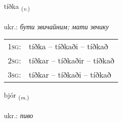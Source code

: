 \documentclass[frontgrid, backgrid]{flacards}\usepackage[]{graphicx}\usepackage[]{xcolor}
\begin{document}
\renewcommand{\flhead}{\vskip5pt \fboxsep=0pt {\small\bfseries\footnotesize Nagnorð | дієслово}}
\renewcommand{\fcfoot}{\vskip5pt \fboxsep=0pt \hspace{2pt}{\small\bfseries\footnotesize 2K}}

\renewcommand{\blhead}{\vskip5pt {\small\bfseries\footnotesize Nagnorð | дієслово }}
\renewcommand{\bcfoot}{\vskip5pt \hspace{2pt}{\small\bfseries\footnotesize 2K}}


{tíðka \small{\textsubscript{(\textit{v.})}} \\[1ex] %
\textphonetic{[tʰiθka]} \\
ukr.: \emph{бути звичайним; мати звчику} \\  [2ex]
\renewcommand*{\arraystretch}{0.8}
\begin{tabular}{p{1cm}l}
\textsc{1sg}: & tíðka -- tíðkaði -- tíðkað \\ 
\textsc{2sg}: & tíðkar -- tíðkaðir -- tíðkað \\ 
\textsc{3sg}: & tíðkar -- tíðkaði -- tíðkað \\ 
\end{tabular}
}

\renewcommand{\flhead}{\vskip5pt \fboxsep=0pt {\small\bfseries\footnotesize Nafnorð | іменник}}
\renewcommand{\fcfoot}{\vskip5pt \fboxsep=0pt \hspace{2pt}{\small\bfseries\footnotesize 2K}}

\renewcommand{\blhead}{\vskip5pt {\small\bfseries\footnotesize Nafnorð | іменник }}
\renewcommand{\bcfoot}{\vskip5pt \hspace{2pt}{\small\bfseries\footnotesize 2K}}


{bjór \small{\textsubscript{(\textit{m.})}} \\[1ex] %
\textphonetic{[pjouːr]} \\
ukr.: \emph{пиво} \\  [2ex]
\renewcommand*{\arraystretch}{0.8}
}
\end{document}
